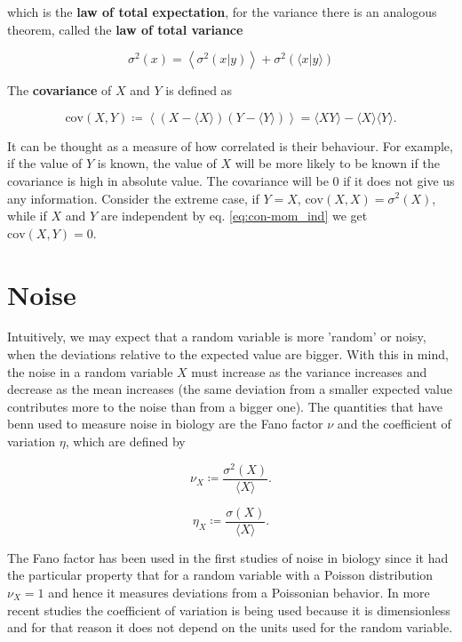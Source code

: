 which is the \textbf{law of total expectation}, for the variance there is an analogous theorem, called the \textbf{law of total variance}

\begin{equation}
  \sigma^2(x) = \left\langle\sigma^2(x|y)\right\rangle + \sigma^2\left(\langle x|y\rangle\right)
\end{equation}

The \textbf{covariance} of $X$ and $Y$ is defined as

\begin{equation}
  \text{cov}(X,Y) \coloneqq \left\langle\left(X-\langle X\rangle\right)\left(Y-\langle Y\rangle\right)\right\rangle = \langle XY\rangle - \langle X\rangle\langle Y\rangle.
\end{equation}

It can be thought as a measure of how correlated is their behaviour. For example, if the value of $Y$ is known, the value of $X$ will be more likely to be known if the covariance is high in absolute value. The covariance will be $0$ if it does not give us any information. Consider the extreme case, if $Y=X$, $\text{cov}(X,X) = \sigma^2(X)$, while if $X$ and $Y$ are independent by eq. \eqref{eq:con-mom_ind} we get $\text{cov}(X,Y) = 0$.

\section{Noise}

Intuitively, we may expect that a random variable is more 'random' or noisy, when the deviations relative to the expected value are bigger. With this in mind, the noise in a random variable $X$ must increase as the variance increases and decrease as the mean increases (the same deviation from a smaller expected value contributes more to the noise than from a bigger one). The quantities that have benn used to measure noise in biology are the Fano factor $\nu$ and the coefficient of variation $\eta$, which are defined by

\begin{equation*}
\nu_X \coloneqq \frac{\sigma^2(X)}{\langle X \rangle}.
\end{equation*}

\begin{equation*}
\eta_X \coloneqq \frac{\sigma(X)}{\langle X \rangle}.
\end{equation*}

The Fano factor has been used in the first studies of noise in biology since it had the particular property that for a random variable with a Poisson distribution $\nu_X=1$ and hence it measures deviations from a Poissonian behavior. In more recent studies the coefficient of variation is being used because it is dimensionless and for that reason it does not depend on the units used for the random variable.

